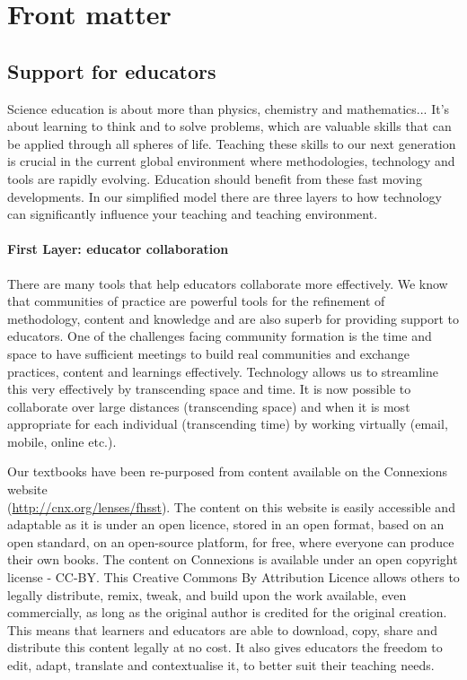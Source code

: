 \chapter{Front matter}

\section{Support for educators}
Science education is about more than physics, chemistry and mathematics... It's about learning to think and to solve problems, which are valuable skills that can be applied through all spheres of life. Teaching these skills to our next generation is crucial in the current global environment where methodologies, technology and tools are rapidly evolving. Education should benefit from these fast moving developments. In our simplified model there are three layers to how technology can significantly influence your teaching and teaching environment. 

\subsubsection{First Layer: educator collaboration}
There are many tools that help educators collaborate more effectively. We know that communities of practice are powerful tools for the refinement of methodology, content and knowledge and are also superb for providing support to educators. One of the challenges facing community formation is the time and space to have sufficient meetings to build real communities and exchange practices, content and learnings effectively. Technology allows us to streamline this very effectively by transcending space and time. It is now possible to collaborate over large distances (transcending space) and when it is most appropriate for each individual (transcending time) by working virtually (email, mobile, online etc.).\par

Our textbooks have been re-purposed from content available on the Connexions website\\ (\underline{http://cnx.org/lenses/fhsst}). The content on this website is easily accessible and adaptable  as it is under an open licence, stored in an open format, based on an open standard, on an open-source platform, for free, where everyone can produce their own books. The content on Connexions is available under an open copyright license - CC-BY. This Creative Commons By Attribution Licence allows others to legally distribute, remix, tweak, and build upon the work available, even commercially, as long as the original author is credited for the original creation. This means that learners and educators are able to download, copy, share and distribute this content legally at no cost. It also gives educators the freedom to edit, adapt, translate and contextualise it, to better suit their teaching needs. \par

